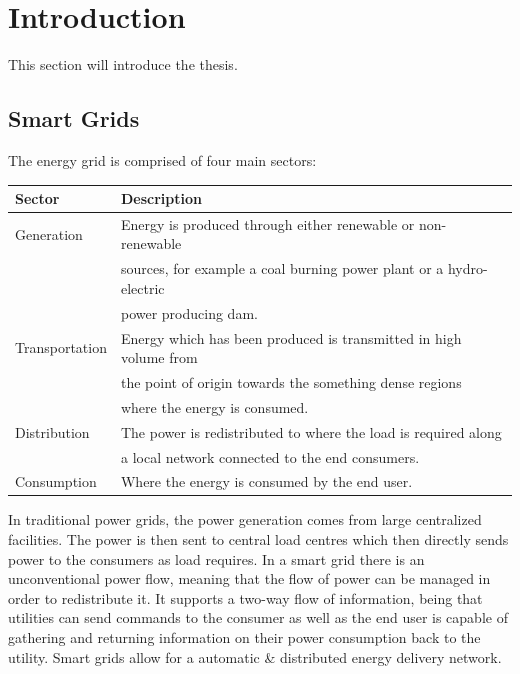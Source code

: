 \chapter{Introduction}
This section will introduce the thesis.
\section{Smart Grids}
The energy grid is comprised of four main sectors:

        \begin{center}
            \begin{tabular}{|l |l|}
            \hline
             \textbf{Sector} & \textbf{Description} \\
             \hline\hline
             \hline
             Generation & 
             Energy is produced through either renewable or non-renewable \\ &
             sources, for example a coal burning power plant or a hydro-electric \\  &
             power producing dam. \\
             \hline
             Transportation & 
             Energy which has been produced is transmitted in high volume from \\ &
             the point of origin towards the something dense regions \\ &
             where the energy is consumed. \\
             \hline
             Distribution & 
             The power is redistributed to where the load is required along \\ &
             a local network connected to the end consumers. \\ 
             \hline
             Consumption & 
             Where the energy is consumed by the end user. \\
             \hline
            \end{tabular}
        \end{center}
In traditional power grids, the power generation comes from large centralized facilities. The power is then sent to central load centres which then directly sends power to the consumers as load requires. In a smart grid there is an unconventional power flow, meaning that the flow of power can be managed in order to redistribute it. It supports a two-way flow of information, being that utilities can send commands to the consumer as well as the end user is capable of gathering and returning information on their power consumption back to the utility. Smart grids allow for a automatic \& distributed energy delivery network.

